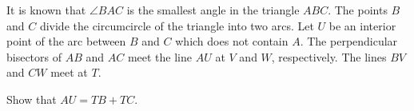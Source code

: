 It is known that $ \angle BAC$ is the smallest angle in the triangle $ ABC$. The points $ B$ and $ C$ divide the circumcircle of the triangle into two arcs. Let $ U$ be an interior point of the arc between $ B$ and $ C$ which does not contain $ A$. The perpendicular bisectors of $ AB$ and $ AC$ meet the line $ AU$ at $ V$ and $ W$,  respectively. The lines $ BV$ and $ CW$ meet at $ T$.

Show that $ AU = TB + TC$.